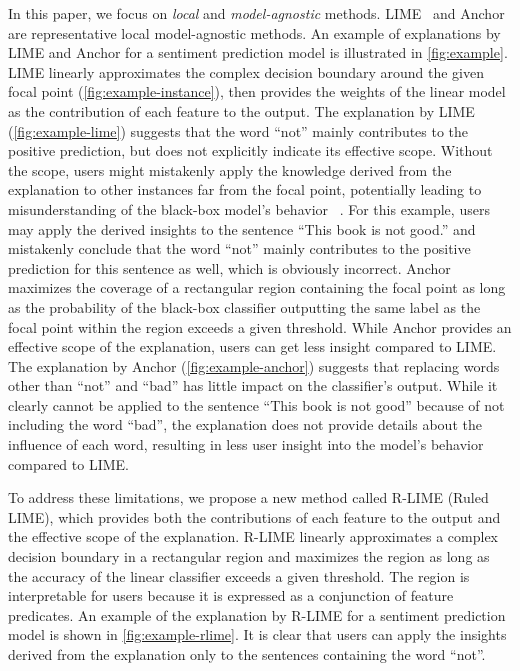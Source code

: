 \documentclass[runningheads]{llncs}
\begin{document}
In this paper,
we focus on \emph{local} and \emph{model-agnostic} methods.
LIME~\cite{ribeiro2016why} and Anchor~\cite{ribeiro2018anchors}
are representative local model-agnostic methods.
An example of explanations by LIME and Anchor
for a sentiment prediction model is illustrated in \cref{fig:example}.
LIME linearly approximates the complex decision boundary
around the given focal point (\cref{fig:example-instance}),
then provides the weights of the linear model as the contribution of each feature
to the output.
The explanation by LIME (\cref{fig:example-lime}) suggests that
the word ``not'' mainly contributes to the positive prediction,
but does not explicitly indicate its effective scope.
Without the scope,
users might mistakenly apply the knowledge derived from the explanation
to other instances far from the focal point,
potentially leading to misunderstanding of the black-box model's behavior
~\cite{ribeiro2018anchors}.
For this example,
users may apply the derived insights
to the sentence ``This book is not good.'' %
and mistakenly conclude that the word ``not''
mainly contributes to the positive prediction for this sentence as well,
which is obviously incorrect.
Anchor maximizes the coverage of a rectangular region containing the focal point
as long as the probability of the black-box classifier outputting
the same label as the focal point within the region exceeds a given threshold.
While Anchor provides an effective scope of the explanation,
users can get less insight compared to LIME\@.
The explanation by Anchor (\cref{fig:example-anchor})
suggests that replacing words other than ``not'' and ``bad''
has little impact on the classifier's output.
While it clearly cannot be applied to the sentence ``This book is not good''
because of not including the word ``bad'',
the explanation does not provide details about the influence of each word,
resulting in less user insight into the model's behavior compared to LIME\@.

To address these limitations,
we propose a new method called R-LIME (Ruled LIME),
which provides both the contributions of each feature to the output
and the effective scope of the explanation.
R-LIME linearly approximates a complex decision boundary
in a rectangular region and maximizes the region
as long as the accuracy of the linear classifier exceeds a given threshold.
The region is interpretable for users because it is
expressed as a conjunction of feature predicates.
An example of the explanation by R-LIME for a sentiment prediction model
is shown in \cref{fig:example-rlime}.
It is clear that users can apply the insights derived from the explanation
only to the sentences containing the word ``not''.
\end{document}
